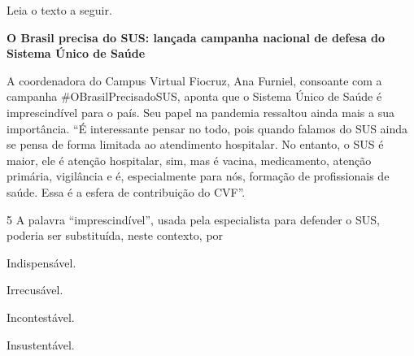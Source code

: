 Leia o texto a seguir.

\begin{myquote}
\begin{center}
\textbf{O Brasil precisa do SUS: lançada campanha nacional de defesa do
Sistema Único de Saúde}\\
\end{center}

\medskip

\noindent A coordenadora do Campus Virtual Fiocruz, Ana Furniel, consoante com a
campanha \#OBrasilPrecisadoSUS, aponta que o Sistema Único de Saúde é
imprescindível para o país. Seu papel na pandemia ressaltou ainda mais a
sua importância. ``É interessante pensar no todo, pois quando falamos do
SUS ainda se pensa de forma limitada ao atendimento hospitalar. No
entanto, o SUS é maior, ele é atenção hospitalar, sim, mas é vacina,
medicamento, atenção primária, vigilância e é, especialmente para nós,
formação de profissionais de saúde. Essa é a esfera de contribuição do
CVF''.

\end{myquote}

\num{5} A palavra ``imprescindível'', usada pela especialista para defender
o SUS, poderia ser substituída, neste contexto, por

\begin{escolha}
\item Indispensável.
\item Irrecusável.
\item Incontestável.
\item Insustentável.
\end{escolha}



